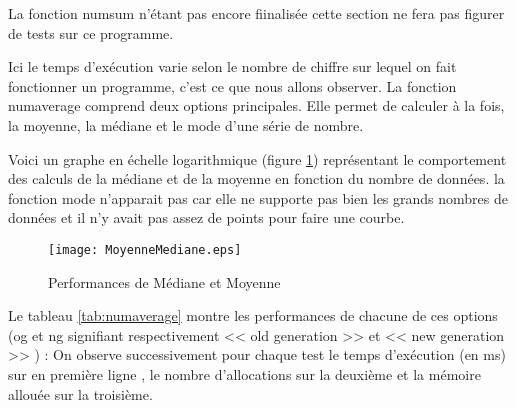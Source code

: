 La fonction numsum n'\'etant pas encore fiinalis\'ee cette section ne fera pas figurer de tests sur ce programme.
\newline

Ici le temps d'ex\'ecution varie selon le nombre de chiffre sur lequel on fait fonctionner un programme, c'est ce que nous allons observer.
La fonction numaverage comprend deux options principales. Elle permet de calculer \`a la fois, la moyenne, la m\'ediane et le mode d'une s\'erie de nombre.
\newline

Voici un graphe en \'echelle logarithmique (figure \ref{tab:medmoy}) repr\'esentant le comportement des calculs de la m\'ediane et de la moyenne en fonction du nombre de 
donn\'ees. la fonction mode n'apparait pas car elle ne supporte pas bien les grands nombres de donn\'ees et il n'y avait pas assez de points pour 
faire une courbe.

\begin{figure}[h]
\begin{center}
\texttt{[image: MoyenneMediane.eps]}
\end{center}
\caption{Performances de M\'ediane et Moyenne}
\label{tab:medmoy}
\end{figure}

Le tableau \ref{tab:numaverage} montre les performances de chacune de ces options (og et ng signifiant respectivement << old generation >> et << new generation >> ) : 
\newline
On observe successivement pour chaque test le temps d'ex\'ecution (en ms) sur en premi\`ere ligne , le nombre d'allocations sur la deuxi\`eme et la m\'emoire
allou\'ee sur la troisi\`eme.
\newline


